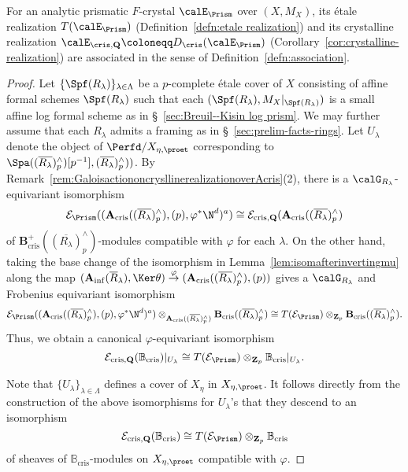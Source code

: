 \begin{prop} \label{prop:etaleandcrysassociated}
For an analytic prismatic $F$-crystal $\calE_{\Prism}$ over $(X,M_X)$, its \'etale realization $T(\calE_{\Prism})$ (Definition~\ref{defn:etale realization}) and its crystalline realization $\calE_{\cris, \mathbf{Q}}\coloneqq D_\cris(\calE_\Prism)$  (Corollary~\ref{cor:crystalline-realization}) are associated in the sense of Definition~\ref{defn:association}. 
\end{prop}

\begin{proof}
Let $\{\Spf (R_{\lambda})\}_{\lambda\in\Lambda}$ be a $p$-complete \'etale cover of $X$ consisting of affine formal schemes $\Spf (R_{\lambda})$ such that each $(\Spf (R_{\lambda}), M_X|_{\Spf (R_{\lambda})})$ is a small affine log formal scheme as in \S~\ref{sec:Breuil--Kisin log prism}. We may further assume that each $R_{\lambda}$ admits a framing as in \S~\ref{sec:prelim-facts-rings}. Let $U_{\lambda}$ denote the object of $\Perfd/X_{\eta, \proet}$ corresponding to $\Spa((\overline{R_{\lambda}})^{\wedge}_p)[p^{-1}], (\overline{R_{\lambda}})^{\wedge}_p))$. By Remark~\ref{rem:GaloisactiononcrysllinerealizationoverAcris}(2), there is a $\calG_{R_\lambda}$-equivariant isomorphism
\[
\mathcal{E}_{\Prism}((\mathbf{A}_{\mathrm{cris}}((\overline{R_{\lambda}})^{\wedge}_p), (p),\varphi^\ast\N^d)^a) \cong \mathcal{E}_{\mathrm{cris}, \mathbf{Q}}(\mathbf{A}_{\mathrm{cris}}((\overline{R_{\lambda}})^{\wedge}_p)
\]
of $\mathbf{B}_{\mathrm{cris}}^+((\overline{R_{\lambda}})^{\wedge}_p)$-modules compatible with $\varphi$ for each $\lambda$. On the other hand, taking the base change of the isomorphism in Lemma~\ref{lem:isomafterinvertingmu} along the map $(\mathbf{A}_{\mathrm{inf}}(\overline{R}_{\lambda}), \Ker \theta) \stackrel{\varphi}{\rightarrow} (\mathbf{A}_{\mathrm{cris}}((\overline{R_{\lambda}})^{\wedge}_p), (p))$ gives a $\calG_{R_\lambda}$ and Frobenius equivariant isomorphism
\[
\mathcal{E}_{\Prism}((\mathbf{A}_{\mathrm{cris}}((\overline{R_{\lambda}})^{\wedge}_p), (p),\varphi^\ast\N^d)^a)\otimes_{\mathbf{A}_{\mathrm{cris}}((\overline{R_{\lambda}})^{\wedge}_p)} \mathbf{B}_{\mathrm{cris}}((\overline{R_{\lambda}})^{\wedge}_p) \cong T(\mathcal{E}_{\Prism})\otimes_{\mathbf{Z}_p} \mathbf{B}_{\mathrm{cris}}((\overline{R_{\lambda}})^{\wedge}_p).
\]
Thus, we obtain a canonical $\varphi$-equivariant isomorphism
\[
\mathcal{E}_{\mathrm{cris}, \mathbf{Q}}(\mathbb{B}_{\mathrm{cris}})|_{U_{\lambda}} \cong T(\mathcal{E}_{\Prism})\otimes_{\mathbf{Z}_p}\mathbb{B}_{\mathrm{cris}} |_{U_{\lambda}}.
\]

Note that $\{U_{\lambda}\}_{\lambda\in \Lambda}$ defines a cover of $X_{\eta}$ in $X_{\eta, \proet}$. It follows directly from the construction of the above isomorphisms for $U_{\lambda}$'s that they descend to an isomorphism
\[
\mathcal{E}_{\mathrm{cris}, \mathbf{Q}}(\mathbb{B}_{\mathrm{cris}}) \cong T(\mathcal{E}_{\Prism})
\otimes_{\mathbf{Z}_p} \mathbb{B}_{\mathrm{cris}}
\]
of sheaves of $\mathbb{B}_{\mathrm{cris}}$-modules on $X_{\eta, \proet}$ compatible with $\varphi$.
\end{proof}

